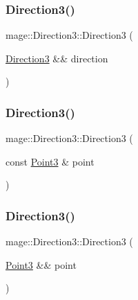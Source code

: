 \hypertarget{structmage_1_1_direction3_a0cefb5629c90c18fe48e4528415f95e9}{}\label{structmage_1_1_direction3_a0cefb5629c90c18fe48e4528415f95e9} 
\subsubsection{\texorpdfstring{Direction3()}{Direction3()}\hspace{0.1cm}{\footnotesize\ttfamily [4/10]}}
{\footnotesize\ttfamily mage\+::\+Direction3\+::\+Direction3 (\begin{DoxyParamCaption}\item[{\hyperlink{structmage_1_1_direction3}{Direction3} \&\&}]{direction }\end{DoxyParamCaption})}

\hypertarget{structmage_1_1_direction3_ad5680af7ed9856d3c5a2454bfec21b3b}{}\label{structmage_1_1_direction3_ad5680af7ed9856d3c5a2454bfec21b3b} 
\subsubsection{\texorpdfstring{Direction3()}{Direction3()}\hspace{0.1cm}{\footnotesize\ttfamily [5/10]}}
{\footnotesize\ttfamily mage\+::\+Direction3\+::\+Direction3 (\begin{DoxyParamCaption}\item[{const \hyperlink{structmage_1_1_point3}{Point3} \&}]{point }\end{DoxyParamCaption})\hspace{0.3cm}{\ttfamily [explicit]}}

\hypertarget{structmage_1_1_direction3_a350aca0e06f13ced11aff8fc3d1c2ed2}{}\label{structmage_1_1_direction3_a350aca0e06f13ced11aff8fc3d1c2ed2} 
\subsubsection{\texorpdfstring{Direction3()}{Direction3()}\hspace{0.1cm}{\footnotesize\ttfamily [6/10]}}
{\footnotesize\ttfamily mage\+::\+Direction3\+::\+Direction3 (\begin{DoxyParamCaption}\item[{\hyperlink{structmage_1_1_point3}{Point3} \&\&}]{point }\end{DoxyParamCaption})\hspace{0.3cm}{\ttfamily [explicit]}}

